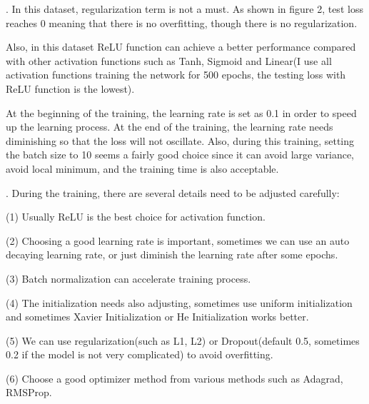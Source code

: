 \documentclass[12pt]{article}
\begin{document}
\par
{}. In this dataset, regularization term is not a must. As shown in figure 2, test loss reaches 0 meaning that there is no overfitting, though there is no regularization.
\par
Also, in this dataset ReLU function can achieve a better performance compared with other activation functions such as Tanh, Sigmoid and Linear(I use all activation functions training the network for 500 epochs, the testing loss with ReLU function is the lowest). 
\par
At the beginning of the training, the learning rate is set as 0.1 in order to speed up the learning process. At the end of the training, the learning rate needs diminishing so that the loss will not oscillate. Also, during this training, setting the batch size to 10 seems a fairly good choice since it can avoid large variance, avoid local minimum, and the training time is also acceptable.
\par
{}. During the training, there are several details need to be adjusted carefully:
\par
(1) Usually ReLU is the best choice for activation function.
\par
(2) Choosing a good learning rate is important, sometimes we can use an auto decaying learning rate, or just diminish the learning rate after some epochs. 
\par
(3) Batch normalization can accelerate training process. 
\par
(4) The initialization needs also adjusting, sometimes use uniform initialization and sometimes Xavier Initialization or He Initialization works better. 
\par 
(5) We can use regularization(such as L1, L2) or Dropout(default 0.5, sometimes 0.2 if the model is not very complicated) to avoid overfitting. 
\par 
(6) Choose a good optimizer method from various methods such as Adagrad, RMSProp.
\end{document}

